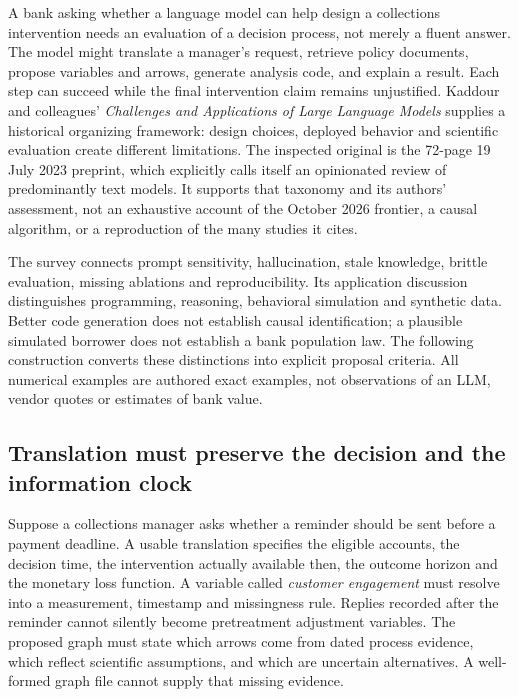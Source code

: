 A bank asking whether a language model can help design a collections intervention
needs an evaluation of a decision process, not merely a fluent answer. The model
might translate a manager's request, retrieve policy documents, propose variables
and arrows, generate analysis code, and explain a result. Each step can succeed
while the final intervention claim remains unjustified. Kaddour and colleagues'
\emph{Challenges and Applications of Large Language Models} supplies a historical
organizing framework: design choices, deployed behavior and scientific evaluation
create different limitations. The inspected original is the 72-page 19 July 2023
preprint, which explicitly calls itself an opinionated review of predominantly
text models. It supports that taxonomy and its authors' assessment, not an
exhaustive account of the October 2026 frontier, a causal algorithm, or a
reproduction of the many studies it cites.~\citep{exec24_llmchallenges_original}

The survey connects prompt sensitivity, hallucination, stale knowledge, brittle
evaluation, missing ablations and reproducibility. Its application discussion
distinguishes programming, reasoning, behavioral simulation and synthetic data.
Better code generation does not establish causal identification; a plausible
simulated borrower does not establish a bank population law. The following
construction converts these distinctions into explicit proposal criteria.
All numerical examples are authored exact examples, not observations of an LLM,
vendor quotes or estimates of bank value.~\citep{exec24_llmchallenges_reference}

\subsection{Translation must preserve the decision and the information clock}

Suppose a collections manager asks whether a reminder should be sent before a
payment deadline. A usable translation specifies the eligible accounts, the
decision time, the intervention actually available then, the outcome horizon
and the monetary loss function. A variable called \emph{customer engagement}
must resolve into a measurement, timestamp and missingness rule. Replies recorded
after the reminder cannot silently become pretreatment adjustment variables.
The proposed graph must state which arrows come from dated process evidence,
which reflect scientific assumptions, and which are uncertain alternatives.
A well-formed graph file cannot supply that missing evidence.

